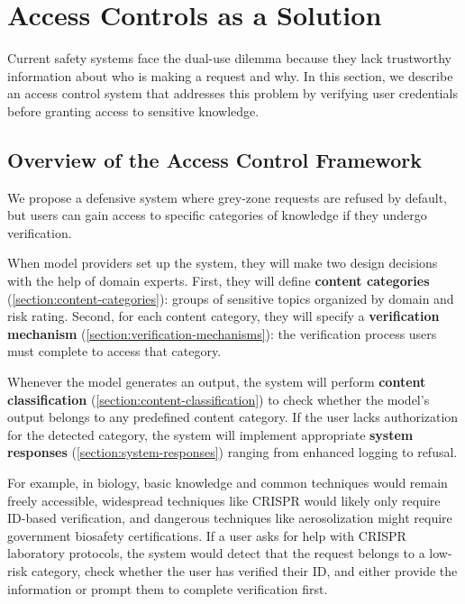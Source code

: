 \documentclass{article}
\theoremstyle{plain}
\theoremstyle{definition}
\theoremstyle{remark}
\begin{document}
\section{Access Controls as a Solution}
\label{section:access-controls}

Current safety systems face the dual-use dilemma because they lack trustworthy information about who is making a request and why.
In this section, we describe an access control system that addresses this problem by verifying user credentials before granting access to sensitive knowledge.

\subsection{Overview of the Access Control Framework} \label{section:access-control-overview}

We propose a defensive system where grey-zone requests are refused by default, but users can gain access to specific categories of knowledge if they undergo verification.

When model providers set up the system, they will make two design decisions with the help of domain experts.
First, they will define \textbf{content categories} (\cref{section:content-categories}): groups of sensitive topics organized by domain and risk rating.
Second, for each content category, they will specify a \textbf{verification mechanism} (\cref{section:verification-mechanisms}): the verification process users must complete to access that category.

Whenever the model generates an output, the system will perform \textbf{content classification} (\cref{section:content-classification}) to check whether the model's output belongs to any predefined content category.
If the user lacks authorization for the detected category, the system will implement appropriate \textbf{system responses} (\cref{section:system-responses}) ranging from enhanced logging to refusal.

For example, in biology, basic knowledge and common techniques would remain freely accessible, widespread techniques like CRISPR would likely only require ID-based verification, and dangerous techniques like aerosolization might require government biosafety certifications.
If a user asks for help with CRISPR laboratory protocols, the system would detect that the request belongs to a low-risk category, check whether the user has verified their ID, and either provide the information or prompt them to complete verification first.
\end{document}
